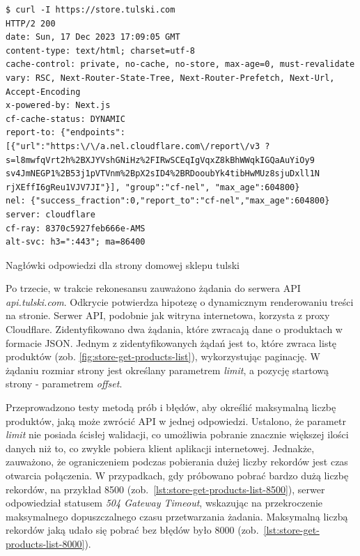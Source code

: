 \begin{listing}[H]
    \begin{verbatim}
$ curl -I https://store.tulski.com
HTTP/2 200
date: Sun, 17 Dec 2023 17:09:05 GMT
content-type: text/html; charset=utf-8
cache-control: private, no-cache, no-store, max-age=0, must-revalidate
vary: RSC, Next-Router-State-Tree, Next-Router-Prefetch, Next-Url, Accept-Encoding
x-powered-by: Next.js
cf-cache-status: DYNAMIC
report-to: {"endpoints":[{"url":"https:\/\/a.nel.cloudflare.com\/report\/v3 ?s=l8mwfqVrt2h%2BXJYVshGNiHz%2FIRwSCEqIgVqxZ8kBhWWqkIGQaAuYiOy9 sv4JmNEGP1%2B53j1pVTVnm%2BpX2sID4%2BRDooubYk4tibHwMUz8sjuDxll1N rjXEffI6gReu1VJV7JI"}], "group":"cf-nel", "max_age":604800}
nel: {"success_fraction":0,"report_to":"cf-nel","max_age":604800}
server: cloudflare
cf-ray: 8370c5927feb666e-AMS
alt-svc: h3=":443"; ma=86400
    \end{verbatim}
    \caption{Nagłówki odpowiedzi dla strony domowej sklepu tulski}
    \label{lst:rekonesans-get-homepage}
\end{listing}

Po trzecie, w trakcie rekonesansu zauważono żądania do serwera API \emph{api.tulski.com}.
Odkrycie potwierdza hipotezę o dynamicznym renderowaniu treści na stronie.
Serwer API, podobnie jak witryna internetowa, korzysta z proxy Cloudflare.
Zidentyfikowano dwa żądania, które zwracają dane o produktach w formacie JSON\@.
Jednym z zidentyfikowanych żądań jest to, które zwraca listę produktów (zob. \autoref{fig:store-get-products-list}), wykorzystując paginację.
W żądaniu rozmiar strony jest określany parametrem \emph{limit}, a pozycję startową strony - parametrem \emph{offset}.

Przeprowadzono testy metodą prób i błędów, aby określić maksymalną liczbę produktów, jaką może zwrócić API w jednej odpowiedzi.
Ustalono, że parametr \emph{limit} nie posiada ścisłej walidacji, co umożliwia pobranie znacznie większej ilości danych niż to, co zwykle pobiera klient aplikacji internetowej.
Jednakże, zauważono, że ograniczeniem podczas pobierania dużej liczby rekordów jest czas otwarcia połączenia.
W przypadkach, gdy próbowano pobrać bardzo dużą liczbę rekordów, na przykład 8500 (zob.~\autoref{lst:store-get-products-list-8500}), serwer odpowiedział statusem \emph{504 Gateway Timeout}, wskazując na przekroczenie maksymalnego dopuszczalnego czasu przetwarzania żadania.
Maksymalną liczbą rekordów jaką udało się pobrać bez błędów było 8000 (zob.~\autoref{lst:store-get-products-list-8000}).

